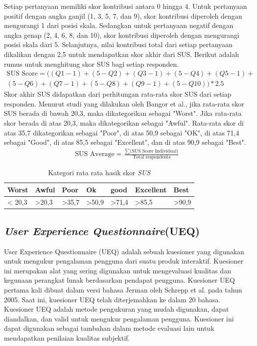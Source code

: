 Setiap pertanyaan memiliki skor kontribusi antara 0 hingga 4. 
Untuk pertanyaan positif dengan angka ganjil (1, 3, 5, 7, dan 9), skor kontribusi diperoleh dengan mengurangi 1 dari posisi skala.
Sedangkan untuk pertanyaan negatif dengan angka genap (2, 4, 6, 8, dan 10), skor kontribusi diperoleh dengan mengurangi posisi skala dari 5.
Selanjutnya, nilai kontribusi total dari setiap pertanyaan dikalikan dengan 2,5 untuk mendapatkan skor akhir dari SUS. Berikut adalah rumus untuk menghitung skor SUS bagi setiap responden.
\begin{equation}
\begin{split}
	\text{SUS Score} = ((Q1-1)+(5-Q2)+(Q3-1)+(5-Q4)+(Q5-1)+ \\ 
	(5-Q6)+(Q7-1)+(5-Q8)+(Q9-1)+(5-Q10))*2.5
\end{split}
\end{equation}
Skor akhir SUS didapatkan dari perhitungan rata-rata skor SUS dari setiap responden.
Menurut studi yang dilakukan oleh Bangor et al., 
jika rata-rata skor SUS berada di bawah 20,3, maka dikategorikan sebagai "Worst".
Jika rata-rata skor berada di atas 20,3, maka dikategorikan sebagai "Awful". 
Rata-rata skor di atas 35,7 dikategorikan sebagai "Poor", di atas 50,9 sebagai "OK", di atas 71,4 sebagai "Good", di atas 85,5 sebagai "Excellent", dan di atas 90,9 sebagai "Best".
\begin{equation}
	\begin{split}
		\text{SUS Average} = \frac{\sum \text{(SUS Score Individual)}}{\text{Total respondents}} 
	\end{split}
	\label{Perhitungan rata-rata skor SUS}
\end{equation}
\begin{table}[htbp]
	\centering
	\caption{Kategori rata rata hasik skor \textit{SUS}}
	\begin{tabular}{|m{}|m{}|m{}|m{}|m{}|m{}|m{}|}
		\hline
		Worst & Awful & Poor & Ok & good & Excellent & Best \\
		\hline
		< 20,3 & >20,3 & >35,7& >50,9 & >71,4& >85,5 & >90,9 \\
		\hline
	\end{tabular}
\end{table}

\subsection{\textit{User Experience Questionnaire}(UEQ)}
User Experience Questionnaire (UEQ) adalah sebuah kuesioner yang digunakan untuk mengukur pengalaman pengguna dari suatu produk interaktif.
Kuesioner ini merupakan alat yang sering digunakan untuk mengevaluasi kualitas dan kegunaan perangkat lunak berdasarkan pendapat pengguna. 
Kuesioner UEQ pertama kali dibuat dalam versi bahasa Jerman oleh Schrepp et al. pada tahun 2005.
Saat ini, kuesioner UEQ telah diterjemahkan ke dalam 20 bahasa. Kuesioner UEQ adalah metode pengukuran yang mudah digunakan, dapat diandalkan, dan valid untuk mengukur pengalaman pengguna.
Kuesioner ini dapat digunakan sebagai tambahan dalam metode evaluasi lain untuk mendapatkan penilaian kualitas subjektif.

